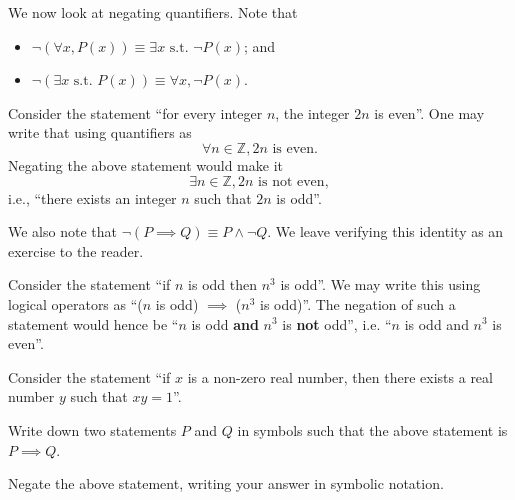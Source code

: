\newpage

We now look at negating quantifiers. Note that
\begin{itemize}
    \item $\lnot(\forall x, P(x)) \equiv \exists x \text{ s.t. } \lnot P(x)$; and
    \item $\lnot(\exists x \text{ s.t. } P(x)) \equiv \forall x, \lnot P(x)$.
\end{itemize}
\begin{example}
    Consider the statement ``for every integer $n$, the integer $2n$ is even''. One may write that using quantifiers as
    \[
        \forall n \in\mathbb{Z}, 2n \text{ is even}.
    \]
    Negating the above statement would make it
    \[
        \exists n \in \mathbb{Z}, 2n \text{ is not even},
    \]
    i.e., ``there exists an integer $n$ such that $2n$ is odd''.
\end{example}

We also note that $\lnot(P \implies Q) \equiv P \land \lnot Q$. We leave verifying this identity as an exercise to the reader.

\begin{example}
    Consider the statement ``if $n$ is odd then $n^3$ is odd''. We may write this using logical operators as ``($n$ is odd) $\implies$ ($n^3$ is odd)''. The negation of such a statement would hence be ``$n$ is odd \textbf{and} $n^3$ is \textbf{not} odd'', i.e. ``$n$ is odd and $n^3$ is even''.
\end{example}

\begin{exercise}
    Consider the statement ``if $x$ is a non-zero real number, then there exists a real number $y$ such that $xy = 1$''.
    \begin{partquestions}{\roman*}
        \item Write down two statements $P$ and $Q$ in symbols such that the above statement is $P \implies Q$.
        \item Negate the above statement, writing your answer in symbolic notation.
    \end{partquestions}
\end{exercise}

\newpage

